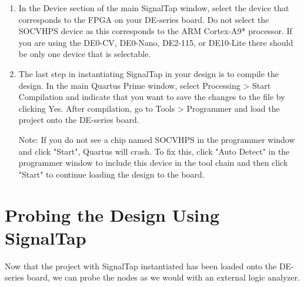 \documentclass[11pt, twoside, pdftex]{article}
\begin{document}
\begin{enumerate}
\item In the Device section of the main SignalTap window, select the device that corresponds to the FPGA on your DE-series board.
Do not select the {\sf SOCVHPS} device as this corresponds to the ARM Cortex-A9* processor.
If you are using the DE0-CV, DE0-Nano, DE2-115, or DE10-Lite there should be only one device that is selectable.
\item The last step in instantiating SignalTap in your design is to compile the design. In the main Quartus Prime window,
select {\sf Processing > Start Compilation} and indicate that you want to save the changes to the file by clicking {\sf Yes}.
After compilation, go to {\sf Tools > Programmer} and load
the project onto the DE-series board.

Note: If you do not see a chip named SOCVHPS in the programmer window and click "Start", Quartus will crash. To fix this, click "Auto Detect" in the programmer window to 
include this device in the tool chain and then click "Start" to continue loading the design to the board.
\end{enumerate}

\section{Probing the Design Using SignalTap}

Now that the project with SignalTap instantiated has been loaded onto the DE-series board, we can
probe the nodes as we would with an external logic analyzer.
\end{document}
